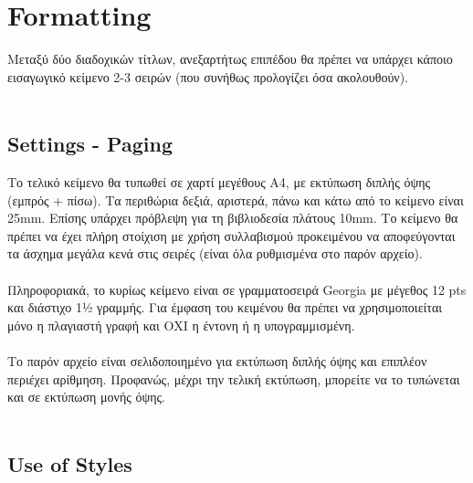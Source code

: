 
\section{Formatting}

\begin{flushleft}
    Μεταξύ δύο διαδοχικών τίτλων, ανεξαρτήτως επιπέδου θα πρέπει να υπάρχει κάποιο εισαγωγικό κείμενο 2-3 σειρών (που συνήθως προλογίζει όσα ακολουθούν).  \\~\\
\end{flushleft}

\subsection{Settings - Paging}

\begin{flushleft}
    Το τελικό κείμενο θα τυπωθεί σε χαρτί μεγέθους Α4, με εκτύπωση διπλής όψης (εμπρός + πίσω). Τα περιθώρια δεξιά, αριστερά, πάνω και κάτω από το κείμενο είναι 25mm. Επίσης υπάρχει πρόβλεψη για τη βιβλιοδεσία πλάτους 10mm. Το κείμενο θα πρέπει να έχει πλήρη στοίχιση με χρήση συλλαβισμού προκειμένου να αποφεύγονται τα άσχημα μεγάλα κενά στις σειρές (είναι όλα ρυθμισμένα στο παρόν αρχείο). \\~\\

    Πληροφοριακά, το κυρίως κείμενο είναι σε γραμματοσειρά Georgia με μέγεθος 12 pts και διάστιχο 1½ γραμμής. Για έμφαση του κειμένου θα πρέπει να χρησιμοποιείται μόνο η πλαγιαστή γραφή και ΟΧΙ η έντονη ή η υπογραμμισμένη. \\~\\
    
    Το παρόν αρχείο είναι σελιδοποιημένο για εκτύπωση διπλής όψης και επιπλέον περιέχει αρίθμηση. Προφανώς, μέχρι την τελική εκτύπωση, μπορείτε να το τυπώνεται και σε εκτύπωση μονής όψης. \\~\\
\end{flushleft}


\subsection{Use of Styles}

